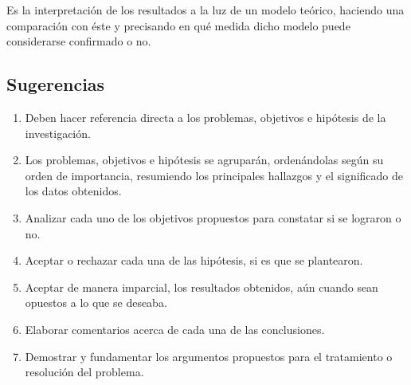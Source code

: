 Es la interpretación de los resultados a la luz de un modelo teórico, haciendo una comparación con éste y precisando en qué medida dicho modelo puede considerarse confirmado o no.

\subsection{Sugerencias}

\begin{enumerate}[noitemsep]
 \item Deben hacer referencia directa a los problemas, objetivos e hipótesis de la investigación.
 \item Los problemas, objetivos e hipótesis se agruparán, ordenándolas según su orden de importancia, resumiendo los principales hallazgos y el significado de los datos obtenidos.
 \item Analizar cada uno de los objetivos propuestos para constatar si se lograron o no.
 \item Aceptar o rechazar cada una de  las hipótesis, si es que se plantearon.
 \item Aceptar de manera imparcial, los resultados obtenidos, aún cuando sean opuestos a lo que se deseaba.
 \item Elaborar comentarios acerca de cada una de las conclusiones.
 \item Demostrar y fundamentar los argumentos propuestos para el tratamiento o resolución del problema.
\end{enumerate}
